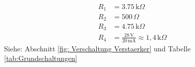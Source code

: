 {        \begin{figure}[H]
        \centering
        
        \label{fig:LsgSpannungsueberwachungLED3}
        \end{figure}
        \begin{align*}
            R_1 &= 3.75 \,\text{k}\Omega \\
            R_2 &= 500 \,\Omega \\
            R_3 &= 4.75 \,\text{k}\Omega \\
            R_4 &= \frac{28 \, \mathrm{V}}{20 \, \mathrm{mA}} \approx 1,4 \,\text{k}\Omega
        \end{align*}
        Siehe: Abschnitt \ref{fig: Verschaltung Verstaerker} und Tabelle \ref{tab:Grundschaltungen}
%            
%            
%            
%            
%            
%            
%            
            
}